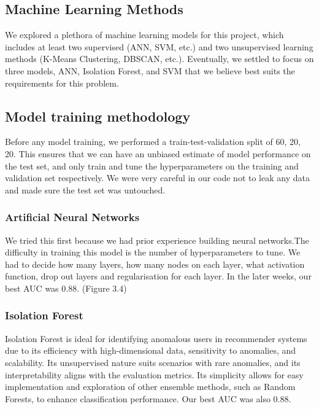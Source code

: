 \documentclass[12pt]{article}
\begin{document}
\subsection{Machine Learning Methods}
We explored a plethora of machine learning models for this project, which includes at least two supervised (ANN, SVM, etc.) and two unsupervised learning methods (K-Means Clustering, DBSCAN, etc.). Eventually, we settled to focus on three models, ANN, Isolation Forest, and SVM that we believe best suits the requirements for this problem.

\subsection{Model training methodology}
Before any model training, we performed a train-test-validation split of 60, 20, 20. This ensures that we can have an unbiased estimate of model performance on the test set, and only train and tune the hyperparameters on the training and validation set respectively. We were very careful in our code not to leak any data and made sure the test set was untouched.

\subsubsection{Artificial Neural Networks}
We tried this first because we had prior experience building neural networks.The difficulty in training this model is the number of hyperparameters to tune. We had to decide how many layers, how many nodes on each layer, what activation function, drop out layers and regularisation for each layer. In the later weeks, our best AUC was 0.88. (Figure 3.4)

\subsubsection{Isolation Forest}
Isolation Forest is ideal for identifying anomalous users in recommender systems due to its efficiency with high-dimensional data, sensitivity to anomalies, and scalability. Its unsupervised nature suits scenarios with rare anomalies, and its interpretability aligns with the evaluation metrics. Its simplicity allows for easy implementation and exploration of other ensemble methods, such as Random Forests, to enhance classification performance. Our best AUC was also 0.88.
\end{document}
